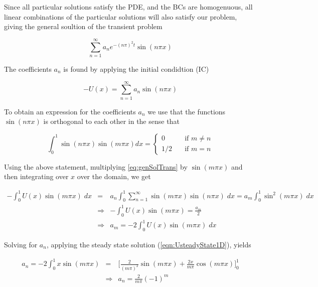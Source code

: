 \documentclass{article}
\begin{document}
Since all particular solutions satisfy the PDE, and the BCs are homogenuous, all linear combinations of the particular solutions will also satisfy our problem, giving the general soultion of the transient problem

\begin{equation}
\sum_{n=1}^{\infty} a_ne^{-(n\pi)^2 t}\sin(n \pi x)
\label{eqn:FundamentalSolutionODE}
\end{equation}

The coefficients $a_n$ is found by applying the initial condidtion (IC)

\begin{equation}\label{eq:genSolTrans}
-U(x) = \sum_{n=1}^{\infty} a_n\sin(n \pi x) 
\end{equation}

To obtain an expression for the coefficients $a_n$ we use that the functions $\sin(n\pi x)$ is orthogonal to each other in the sense that 

\begin{equation}
\int_0^1 \sin(n\pi x) \sin(m\pi x) dx = 
\begin{cases} 0 & \quad \text{if } m \neq n\\
1/2 & \quad \text{if } m = n 
\end{cases}
\label{eqn:orhogonalSine}
\end{equation}

Using the above statement, multiplying \ref{eq:genSolTrans} by $\sin(m\pi x)$  and then integrating over $x$ over the domain, we get 

\begin{eqnarray}
\nonumber
- \int_0^1 U(x)\sin(m\pi x)\;dx &=& a_n \int_0^1 \sum_{n=1}^{\infty} \sin(m\pi x)\sin(n\pi x)\;dx = a_m\int_0^1 \sin^2(m\pi x)\;dx\\ \nonumber
&\Rightarrow& - \int_0^1 U(x)\sin(m\pi x) =\frac{a_m}{2}\\ 
&\Rightarrow& a_m = - 2\int_0^1 U(x)\sin(m\pi x) \;dx
\end{eqnarray}

Solving for $a_n$, applying the steady state solution (\ref{eqn:UsteadyState1D}), yields 

\begin{eqnarray}
\nonumber
a_n = -2 \int_0^1 x \sin(m\pi x) &=& \Big[\frac{2}{(m\pi)^2} \sin(m\pi x) + \frac{2x}{m\pi}\cos(m\pi x)\Big]_0^1 \\ 
\label{eqn:fourierCoefficients}
&\Rightarrow & a_n = \frac{2}{m\pi}(-1)^m
\end{eqnarray}
\newline
\end{document}
